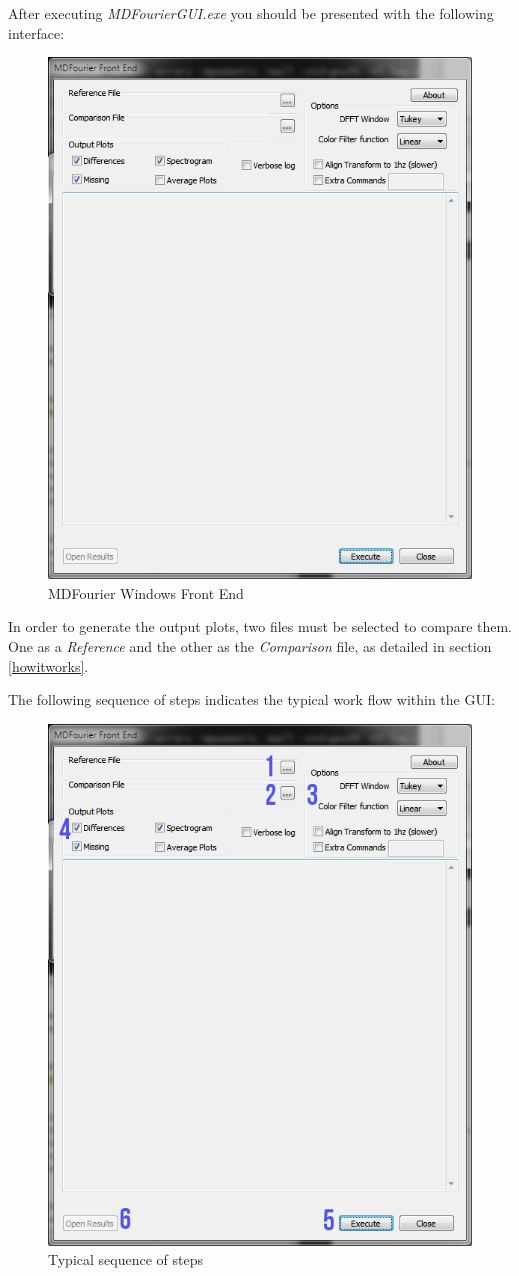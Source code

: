 \documentclass[10pt,a4paper]{report}
\begin{document}
After executing \textit{MDFourierGUI.exe} you should be presented with the following interface:

\begin{figure}[H]
	\centering
	\includegraphics[width=0.6\linewidth]{plots/GUI1.png}
	\caption[Front End]{MDFourier Windows Front End}
	\label{fig:gui1}
\end{figure}

In order to generate the output plots, two files must be selected to compare them. One as a \textit{Reference} and the other as the \textit{Comparison} file, as detailed in section \ref{howitworks}.

The following sequence of steps indicates the typical work flow within the GUI:

\begin{figure}[H]
	\centering
	\includegraphics[width=0.6\linewidth]{plots/GUI2.png}
	\caption[Steps]{Typical sequence of steps}
	\label{fig:gui2}
\end{figure}
\end{document}
